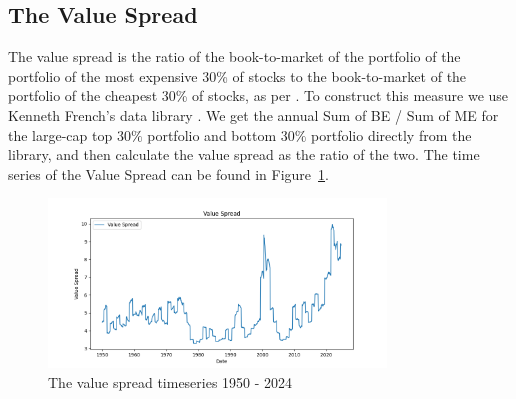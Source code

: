 \subsection{The Value Spread}

The value spread is the ratio of the book-to-market of the portfolio of the portfolio of the most expensive 30\% of stocks to the book-to-market of the portfolio of the cheapest 30\% of stocks, as per \citet{fama_french_1993}.
To construct this measure we use Kenneth French's data library \citep{french_website}. 
We get the annual Sum of BE / Sum of ME for the large-cap top $30\%$ portfolio and bottom $30\%$ portfolio directly from the library, and then calculate the value spread as the ratio of the two. The time series of the Value Spread can be found in
 Figure~\ref{fig:value_spread}.

\begin{figure}[h!]
    \centering
    \includegraphics[width=0.8\textwidth]{../figs/Value Spread.png}
    \caption{The value spread timeseries 1950 - 2024}
    \label{fig:value_spread}
\end{figure}
